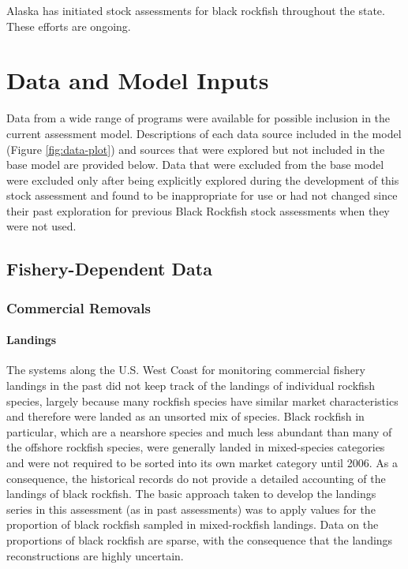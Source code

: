 \documentclass[11pt,
  english,
  letterpaper,
]{article}
\begin{document}
Alaska has initiated stock assessments for black rockfish throughout the state. These efforts are ongoing.

\hypertarget{data-and-model-inputs}{%
\section{Data and Model Inputs}\label{data-and-model-inputs}}

Data from a wide range of programs were available for possible inclusion in the current assessment model. Descriptions of each data source included in the model (Figure \ref{fig:data-plot}) and sources that were explored but not included in the base model are provided below. Data that were excluded from the base model were excluded only after being explicitly explored during the development of this stock assessment and found to be inappropriate for use or had not changed since their past exploration for previous Black Rockfish stock assessments when they were not used.

\hypertarget{fishery-dependent-data}{%
\subsection{Fishery-Dependent Data}\label{fishery-dependent-data}}

\hypertarget{commercial-removals}{%
\subsubsection{Commercial Removals}\label{commercial-removals}}

\hypertarget{landings}{%
\paragraph{Landings}\label{landings}}

The systems along the U.S. West Coast for monitoring commercial fishery landings in the past did not keep track of the landings of individual rockfish species, largely because many rockfish species have similar market characteristics and therefore were landed as an unsorted mix of species. Black rockfish in particular, which are a nearshore species and much less abundant than many of the offshore rockfish species, were generally landed in mixed-species categories and were not required to be sorted into its own market category until 2006. As a consequence, the historical records do not provide a detailed accounting of the landings of black rockfish. The basic approach taken to develop the landings series in this assessment (as in past assessments) was to apply values for the proportion of black rockfish sampled in mixed-rockfish landings. Data on the proportions of black rockfish are sparse, with the consequence that the landings reconstructions are highly uncertain.
\end{document}
